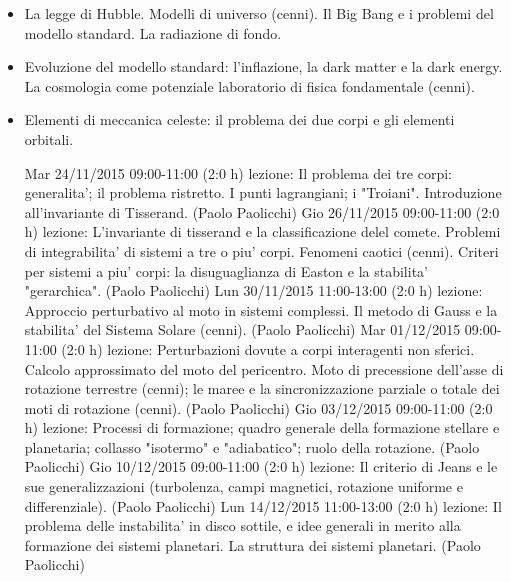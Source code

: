 \documentclass[oneside,12pt,fleqn]{memoir}
\begin{document}
\begin{itemize}
\item La legge di Hubble. Modelli di universo (cenni). Il Big Bang e i problemi del modello standard. La radiazione di fondo. 

\item Evoluzione del modello standard: l'inflazione, la dark matter e la dark energy. La cosmologia come potenziale laboratorio di fisica fondamentale (cenni). 

\item Elementi di meccanica celeste: il problema dei due corpi e gli elementi orbitali.

Mar 24/11/2015 09:00-11:00 (2:0 h) lezione: Il problema dei tre corpi: generalita'; il problema ristretto. I punti lagrangiani; i "Troiani". Introduzione all'invariante di Tisserand. (Paolo Paolicchi)
Gio 26/11/2015 09:00-11:00 (2:0 h) lezione: L'invariante di tisserand e la classificazione delel comete. Problemi di integrabilita' di sistemi a tre o piu' corpi. Fenomeni caotici (cenni). Criteri per sistemi a piu' corpi: la disuguaglianza di Easton e la stabilita' "gerarchica". (Paolo Paolicchi)
Lun 30/11/2015 11:00-13:00 (2:0 h) lezione: Approccio perturbativo al moto in sistemi complessi. Il metodo di Gauss e la stabilita' del Sistema Solare (cenni). (Paolo Paolicchi)
Mar 01/12/2015 09:00-11:00 (2:0 h) lezione: Perturbazioni dovute a corpi interagenti non sferici. Calcolo approssimato del moto del pericentro. Moto di precessione dell'asse di rotazione terrestre (cenni); le maree e la sincronizzazione parziale o totale dei moti di rotazione (cenni). (Paolo Paolicchi)
Gio 03/12/2015 09:00-11:00 (2:0 h) lezione: Processi di formazione; quadro generale della formazione stellare e planetaria; collasso "isotermo" e "adiabatico"; ruolo della rotazione. (Paolo Paolicchi)
Gio 10/12/2015 09:00-11:00 (2:0 h) lezione: Il criterio di Jeans e le sue generalizzazioni (turbolenza, campi magnetici, rotazione uniforme e differenziale). (Paolo Paolicchi)
Lun 14/12/2015 11:00-13:00 (2:0 h) lezione: Il problema delle instabilita' in disco sottile, e idee generali in merito alla formazione dei sistemi planetari. La struttura dei sistemi planetari. (Paolo Paolicchi)

\end{itemize}

\clearpage

\renewcommand{\listfigurename}{Elenco figure}
 
\renewcommand{\indexname}{Indice}

\listoffigures

\printindex
\end{document}
